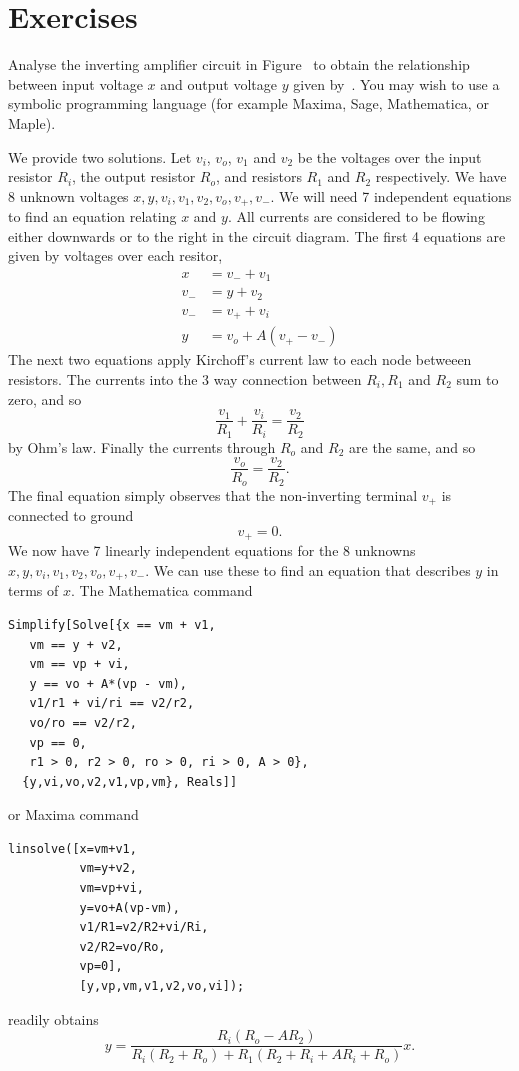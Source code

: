 
\section*{Exercises}

\begin{excersizelist}

\item \label{exer:multiplieropampwithmodel}  Analyse the inverting amplifier circuit in Figure~ to obtain the relationship between input voltage $x$ and output voltage $y$ given by~.  You may wish to use a symbolic programming language (for example Maxima, Sage, Mathematica, or Maple).
\begin{solution}
We provide two solutions.  Let $v_i$, $v_o$, $v_1$ and $v_2$ be the voltages over the input resistor $R_i$, the output resistor $R_o$, and resistors $R_1$ and $R_2$ respectively.  We have 8 unknown voltages $x,y,v_i,v_1,v_2,v_o,v_+,v_-$.  We will need 7 independent equations to find an equation relating $x$ and $y$.  All currents are considered to be flowing either downwards or to the right in the circuit diagram.  The first 4 equations are given by voltages over each resitor,
\begin{align*}
x &= v_- + v_1 \\
v_- &= y + v_2 \\
v_- &= v_+ + v_i \\
y &= v_o + A(v_+ - v_-) 
\end{align*}
The next two equations apply Kirchoff's current law to each node betweeen resistors.  The currents into the 3 way connection between $R_i, R_1$ and $R_2$ sum to zero, and so
\[
\frac{v_1}{R_1} + \frac{v_i}{R_i} = \frac{v_2}{R_2}
\]
by Ohm's law.  Finally the currents through $R_o$ and $R_2$ are the same, and so
\[
\frac{v_o}{R_o} = \frac{v_2}{R_2}.
\]
The final equation simply observes that the non-inverting terminal $v_+$ is connected to ground
\[
v_+ = 0.
\]
We now have 7 linearly independent equations for the 8 unknowns $x,y,v_i,v_1,v_2,v_o,v_+,v_-$.  We can use these to find an equation that describes $y$ in terms of $x$.  The Mathematica command
\begin{verbatim}
Simplify[Solve[{x == vm + v1,
   vm == y + v2,
   vm == vp + vi,
   y == vo + A*(vp - vm),
   v1/r1 + vi/ri == v2/r2,
   vo/ro == v2/r2,
   vp == 0,
   r1 > 0, r2 > 0, ro > 0, ri > 0, A > 0},
  {y,vi,vo,v2,v1,vp,vm}, Reals]]
\end{verbatim}
or Maxima command
\begin{verbatim}
linsolve([x=vm+v1,
          vm=y+v2,
          vm=vp+vi,
          y=vo+A(vp-vm),
          v1/R1=v2/R2+vi/Ri,
          v2/R2=vo/Ro,
          vp=0],
          [y,vp,vm,v1,v2,vo,vi]);
\end{verbatim}
readily obtains
\[
y = \frac{R_i (R_o - A R_2) }{R_i (R_2+R_o)+R_1 (R_2+R_i + A R_i+R_o)}x.
\]


\end{solution}
\end{excersizelist}
